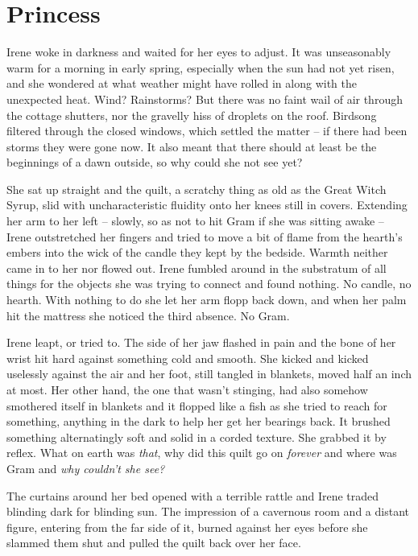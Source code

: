 \documentclass[../FGP.tex]{subfiles}
\begin{document}
\setmarginpargeometry
\section{Princess}
\begin{fragment}
Irene woke in darkness and waited for her eyes to adjust. It was unseasonably warm for a morning in early spring, especially when the sun had not yet risen, and she wondered at what weather might have rolled in along with the unexpected heat. Wind? Rainstorms? But there was no faint wail of air through the cottage shutters, nor the gravelly hiss of droplets on the roof. Birdsong filtered through the closed windows, which settled the matter -- if there had been storms they were gone now. It also meant that there should at least be the beginnings of a dawn outside, so why could she not see yet?

She sat up straight and the quilt, a scratchy thing as old as the Great Witch Syrup, slid with uncharacteristic fluidity onto her knees still in covers. Extending her arm to her left -- slowly, so as not to hit Gram if she was sitting awake -- Irene outstretched her fingers and tried to move a bit of flame from the hearth's embers into the wick of the candle they kept by the bedside. Warmth neither came in to her nor flowed out. Irene fumbled around in the substratum of all things for the objects she was trying to connect and found nothing. No candle, no hearth. With nothing to do she let her arm flopp back down, and when her palm hit the mattress she noticed the third absence. No Gram.

Irene leapt, or tried to. The side of her jaw flashed in pain and the bone of her wrist hit hard against something cold and smooth. She kicked and kicked uselessly against the air and her foot, still tangled in blankets, moved half an inch at most. Her other hand, the one that wasn't stinging, had also somehow smothered itself in blankets and it flopped like a fish as she tried to reach for something, anything in the dark to help her get her bearings back. It brushed something alternatingly soft and solid in a corded texture. She grabbed it by reflex. What on earth was \emph{that}, why did this quilt go on \emph{forever} and where was Gram and \emph{why couldn't she see?} 

The curtains around her bed opened with a terrible rattle and Irene traded blinding dark for blinding sun. The impression of a cavernous room and a distant figure, entering from the far side of it, burned against her eyes before she slammed them shut and pulled the quilt back over her face. 


\end{fragment}
\end{document}
